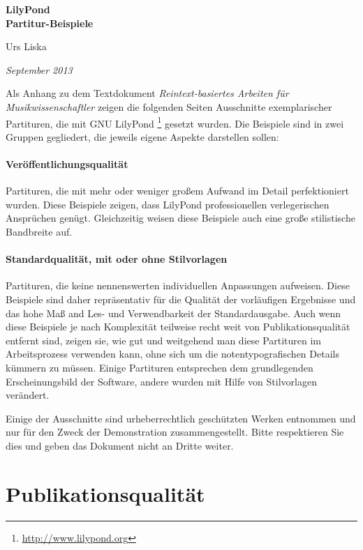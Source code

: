 \documentclass[DIV=12]{scrreprt}
\begin{document}
\begin{center}
\vspace*{3cm}
{ \Huge \textbf{\textsf{LilyPond\\
\vspace{1ex}
\huge Partitur-Beispiele}} }

\bigskip
{ \Large Urs Liska }

\emph{September 2013} 

\end{center}

\vspace{2cm}

Als Anhang zu dem Textdokument \emph{Reintext-basiertes Arbeiten für Musikwissenschaftler} zeigen die folgenden Seiten Ausschnitte exemplarischer Partituren, die mit GNU LilyPond%
\footnote{\url{http://www.lilypond.org}}
gesetzt wurden.
Die Beispiele sind in zwei Gruppen gegliedert, die jeweils eigene Aspekte darstellen sollen:
\paragraph{Veröffentlichungsqualität}
Partituren, die mit mehr oder weniger großem Aufwand im Detail perfektioniert wurden.
Diese Beispiele zeigen, dass LilyPond professionellen verlegerischen Ansprüchen genügt.
Gleichzeitig weisen diese Beispiele auch eine große stilistische Bandbreite auf.

\paragraph{Standardqualität, mit oder ohne Stilvorlagen}
Partituren, die keine nennenswerten individuellen Anpassungen aufweisen.
Diese Beispiele sind daher repräsentativ für die Qualität der vorläufigen Ergebnisse und das hohe Maß and Les- und Verwendbarkeit der Standardausgabe.
Auch wenn diese Beispiele je nach Komplexität teilweise recht weit von Publikationsqualität entfernt sind, zeigen sie, wie gut und weitgehend man diese Partituren im Arbeitsprozess verwenden kann, ohne sich um die notentypografischen Details kümmern zu müssen.
Einige Partituren entsprechen dem grundlegenden Erscheinungsbild der Software, andere wurden mit Hilfe von Stilvorlagen verändert.

Einige der Ausschnitte sind urheberrechtlich geschützten Werken entnommen und nur für den Zweck der Demonstration zusammengestellt.
Bitte respektieren Sie dies und geben das Dokument nicht an Dritte weiter.

\pagebreak
\section*{Publikationsqualität}
\end{document}
